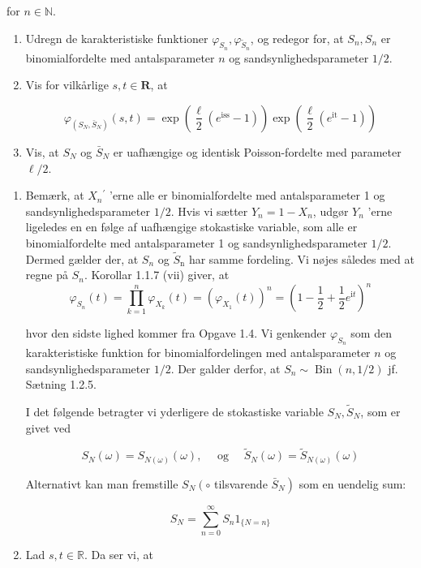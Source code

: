 \documentclass{Class}
\newcommand{\1}{\mathbbm{1}}
\theoremstyle{boxed}
\begin{document}
for $n \in \mathbb{N}$.
\begin{enumerate}
  \item Udregn de karakteristiske funktioner $\varphi_{S_n}, \varphi_{\tilde{S}_n}$, og redegor for, at $S_n, S_n$ er binomialfordelte med antalsparameter $n$ og sandsynlighedsparameter $1 / 2$.
  \item Vis for vilkårlige $s, t \in \mathbf{R}$, at

  $$
  \varphi_{\left(S_N, \bar{S}_N\right)}(s, t)=\exp \left(\frac{\ell}{2}\left(e^{\mathrm{iss}}-1\right)\right) \exp \left(\frac{\ell}{2}\left(e^{\mathrm{it}}-1\right)\right)
  $$
  \item Vis, at $S_N$ og $\bar{S}_N$ er uafhængige og identisk Poisson-fordelte med parameter $\ell / 2$.
\end{enumerate}
\solution
\begin{enumerate}
  \item Bemærk, at $X_n{ }^{\prime}$ 'erne alle er binomialfordelte med antalsparameter 1 og sandsynlighedsparameter $1 / 2$. Hvis vi sætter $Y_n=1-X_n$, udgør $Y_n$ 'erne ligeledes en en følge af uafhængige stokastiske variable, som alle er binomialfordelte med antalsparameter 1 og sandsynlighedsparameter $1 / 2$. Dermed gælder der, at $S_n$ og $\tilde{S}_{\mathrm{n}}$ har samme fordeling. Vi nøjes således med at regne på $S_n$. Korollar 1.1.7 (vii) giver, at
  $$
  \varphi_{S_n}(t)=\prod_{k=1}^n \varphi_{X_k}(t)=\left(\varphi_{X_1}(t)\right)^n=\left(1-\frac{1}{2}+\frac{1}{2} e^{\mathrm{i} t}\right)^n
  $$
  
  hvor den sidste lighed kommer fra Opgave 1.4. Vi genkender $\varphi_{S_n}$ som den karakteristiske funktion for binomialfordelingen med antalsparameter $n$ og sandsynlighedsparameter $1 / 2$. Der galder derfor, at $S_n \sim \operatorname{Bin}(n, 1 / 2)$ jf. Sætning 1.2.5.
  
  I det følgende betragter vi yderligere de stokastiske variable $S_N, \tilde{S}_N$, som er givet ved
  
  $$
  S_N(\omega)=S_{N(\omega)}(\omega), \quad \text { og } \quad \tilde{S}_N(\omega)=\tilde{S}_{N(\omega)}(\omega)
  $$
  
  
  Alternativt kan man fremstille $S_N\left(\circ\right.$ tilsvarende $\left.\bar{S}_N\right)$ som en uendelig sum:
  
  $$
  S_N=\sum_{n=0}^{\infty} S_n 1_{\{N=n\}}
  $$
  \item Lad $s, t \in \mathbb{R}$. Da ser vi, at


\end{enumerate}
\end{document}
